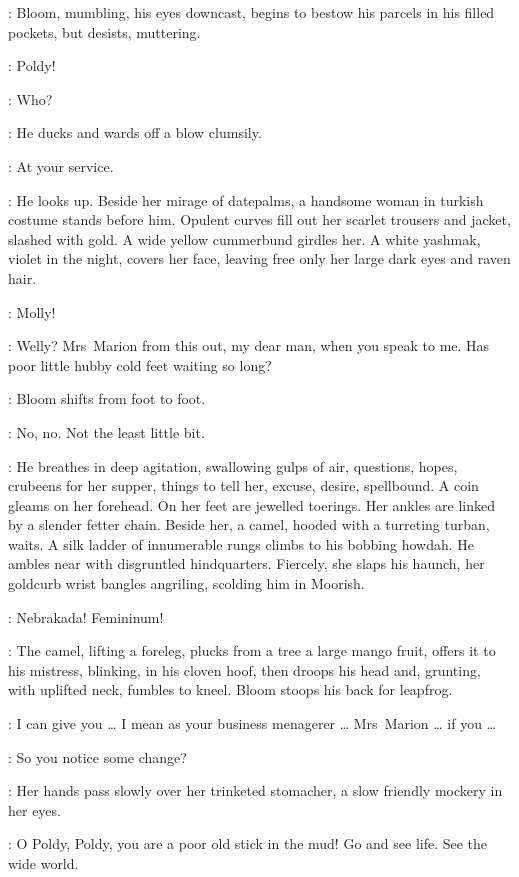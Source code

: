 :
Bloom,
mumbling,
his eyes downcast,
begins to bestow his parcels in his filled pockets,
but desists,
muttering.

\Marion:
Poldy!

\Bloom:
Who?

:
He ducks and wards off a blow clumsily.

\Bloom:
At your service.

:
He looks up.
Beside her mirage of datepalms,
a handsome woman in turkish costume stands before him.
Opulent curves fill out her scarlet trousers and jacket,
slashed with gold.
A wide yellow cummerbund girdles her.
A white yashmak,
violet in the night,
covers her face,
leaving free only her large dark eyes and raven hair.

\Bloom:
Molly!

\Marion[1]:
Welly?
Mrs~Marion from this out,
my dear man,
when you speak to me.
Has poor little hubby cold feet waiting so long?

:
Bloom shifts from foot to foot.

\Bloom:
No,
no.
Not the least little bit.

:
He breathes in deep agitation,
swallowing gulps of air,
questions,
hopes,
cru\-beens for her supper,
things to tell her,
excuse,
desire,
spellbound.
A coin gleams on her forehead.
On her feet are jewelled toerings.
Her ankles are linked by a slender fetter chain.
Beside her,
a camel,
hooded with a turreting turban,
waits.
A silk ladder of innumerable rungs climbs to his bobbing howdah.
He ambles near with disgruntled hindquarters.
Fiercely,
she slaps his haunch,
her goldcurb wrist bangles angriling,
scolding him in Moorish.

\Marion:
Nebrakada!
Femininum!

:
The camel,
lifting a foreleg,
plucks from a tree a large mango fruit,
offers it to his mistress,
blinking,
in his cloven hoof,
then droops his head and,
grunting,
with uplifted neck,
fumbles to kneel.
Bloom stoops his back for leapfrog.

\Bloom:
I can give you \ldots
I mean as your business menagerer \ldots
Mrs~Marion \ldots
if you \ldots

\Marion:
So you notice some change?

:
Her hands pass slowly over her trinketed stomacher,
a slow friendly mockery in her eyes.

\Marion:
O Poldy,
Poldy,
you are a poor old stick in the mud!
Go and see life.
See the wide world.

